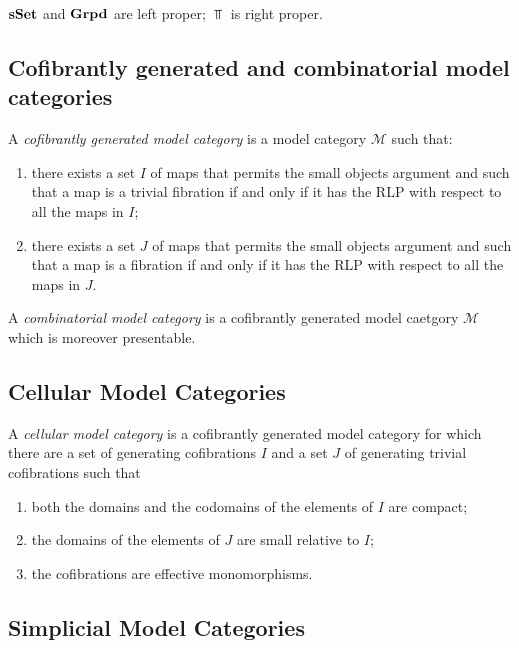 \begin{cor}
$\mathbf{sSet}$ and $\mathbf{Grpd}$ are left proper; $\Top$ is right proper.
\end{cor}

\subsection{Cofibrantly generated and combinatorial model categories}

\begin{defin}
A \emph{cofibrantly generated model category} is a model category $\mathcal M$ such that:
\begin{enumerate}
\item there exists a set $I$ of maps that permits the small objects argument and such that a map is a trivial fibration if and only if it has the RLP with respect to all the maps in $I$;
\item there exists a set $J$ of maps that permits the small objects argument and such that a map is a fibration if and only if it has the RLP with respect to all the maps in $J$.
\end{enumerate}
\end{defin}

\begin{defin}
A \emph{combinatorial model category} is a cofibrantly generated model caetgory $\mathcal M$ which is moreover presentable.
\end{defin}

\subsection{Cellular Model Categories}

\begin{defin}
A \emph{cellular model category} is a cofibrantly generated model category for which there are a set of generating cofibrations $I$ and a set $J$ of generating trivial cofibrations such that
\begin{enumerate}
\item both the domains and the codomains of the elements of $I$ are compact;
\item the domains of the elements of $J$ are small relative to $I$;
\item the cofibrations are effective monomorphisms.
\end{enumerate}
\end{defin}

\subsection{Simplicial Model Categories} \label{simplicial model categories}

